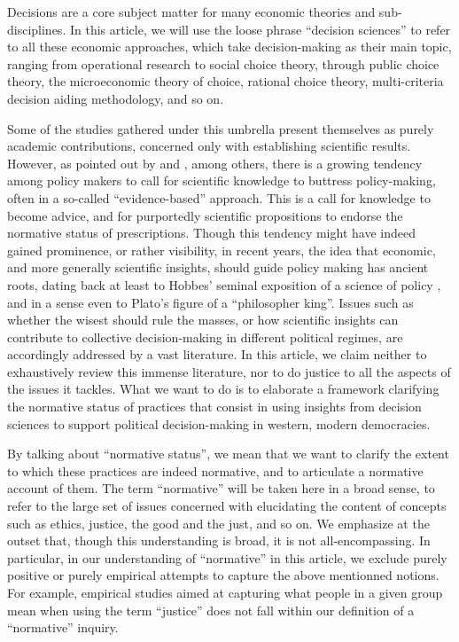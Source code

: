 \documentclass[preprint,11pt]{elsarticle}
\begin{document}
\noindent Decisions are a core subject matter for many economic theories and sub-disciplines. In this article, we will use the loose phrase ``decision sciences'' to refer to all these economic approaches, which take decision-making as their main topic, ranging from operational research to social choice theory, through public choice theory, the microeconomic theory of choice, rational choice theory, multi-criteria decision aiding methodology, and so on.

Some of the studies gathered under this umbrella present themselves as purely academic contributions, concerned only with establishing scientific results. However, as pointed out by \cite{tsoukias_policy_2013} and \cite{marchi_evidence-based_2016}, among others, there is a growing tendency among policy makers to call for scientific knowledge to buttress policy-making, often in a so-called ``evidence-based'' approach. This is a call for knowledge to become advice, and for purportedly scientific propositions to endorse the normative status of prescriptions. Though this tendency might have indeed gained prominence, or rather visibility, in recent years, the idea that economic, and more generally scientific insights, should guide policy making has ancient roots, dating back at least to Hobbes’ seminal exposition of a science of policy \citep{skinner_reason_1996}, and in a sense even to Plato's figure of a ``philosopher king''. Issues such as whether the wisest should rule the masses, or how scientific insights can contribute to collective decision-making in different political regimes, are accordingly addressed by a vast literature. In this article, we claim neither to exhaustively review this immense literature, nor to do justice to all the aspects of the issues it tackles. What we want to do is to elaborate a framework clarifying the normative status of practices that consist in using insights from decision sciences to support political decision-making in western, modern democracies.

By talking about ``normative status'', we mean that we want to clarify the extent to which these practices are indeed normative, and to articulate a normative account of them. The term ``normative'' will be taken here in a broad sense, to refer to the large set of issues concerned with elucidating the content of concepts such as ethics, justice, the good and the just, and so on. We emphasize at the outset that, though this understanding is broad, it is not all-encompassing. In particular, in our understanding of ``normative'' in this article, we exclude purely positive or purely empirical attempts to capture the above mentionned notions. For example, empirical studies aimed at capturing what people in a given group mean when using the term ``justice'' does not fall within our definition of a ``normative'' inquiry.
\end{document}
